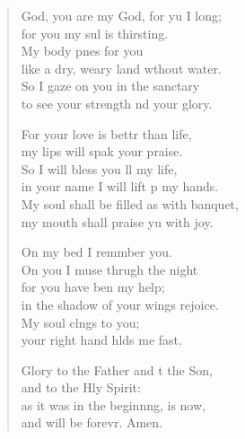 \begin{verse}
  \begin{patverse}
     God, you are my God, for yu I long;\Med\\
for you my sul is thirsting.\\
My body p\pointup{\i}nes for you\Med\\
like a dry, weary land wthout water.\\
So I gaze on you in the sanctary\Med\\
to see your strength nd your glory.

For your love is bettr than life,\Med\\
my lips will spak your praise.\\
So I will bless you ll my life,\Med\\
in your name I will lift p my hands.\\
My soul shall be filled as with  banquet,\Med\\
my mouth shall praise yu with joy.

On my bed I remmber you.\Med\\
On you I muse thrugh the night\\
for you have ben my help;\Med\\
in the shadow of your wings  rejoice.\\
My soul cl\pointup{\i}ngs to you;\Med\\
your right hand hlds me fast.

Glory to the Father and t the Son,\Med\\
and to the Hly Spirit:\\
as it was in the beginn\pointup{\i}ng, is now,\Med\\
and will be forevr. Amen.
  \end{patverse}
\end{verse}
